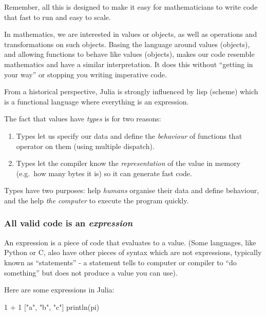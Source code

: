 \documentclass[
]{article}
\newenvironment{Shaded}{\begin{snugshade}}{\end{snugshade}}
\newcommand{\ConstantTok}[1]{\textcolor[rgb]{0.56,0.35,0.01}{#1}}
\newcommand{\FloatTok}[1]{\textcolor[rgb]{0.68,0.00,0.00}{#1}}
\newcommand{\FunctionTok}[1]{\textcolor[rgb]{0.28,0.35,0.67}{#1}}
\newcommand{\NormalTok}[1]{\textcolor[rgb]{0.00,0.23,0.31}{#1}}
\newcommand{\OperatorTok}[1]{\textcolor[rgb]{0.37,0.37,0.37}{#1}}
\newcommand{\StringTok}[1]{\textcolor[rgb]{0.13,0.47,0.30}{#1}}
\providecommand{\tightlist}{%
  \setlength{\itemsep}{0pt}\setlength{\parskip}{0pt}}
\begin{document}
Remember, all this is designed to make it easy for mathematicians to
write code that fast to run and easy to scale.

In mathematics, we are interested in values or objects, as well as
operations and transformations on such objects. Basing the language
around values (objects), and allowing functions to behave like values
(objects), makes our code resemble mathematics and have a similar
interpretation. It does this without ``getting in your way'' or stopping
you writing imperative code.

From a historical perspective, Julia is strongly influenced by lisp
(scheme) which is a functional language where everything is an
expression.

The fact that values have \emph{types} is for two reasons:

\begin{enumerate}
\def\labelenumi{\arabic{enumi}.}
\tightlist
\item
  Types let us specify our data and define the \emph{behaviour} of
  functions that operator on them (using multiple dispatch).
\item
  Types let the compiler know the \emph{representation} of the value in
  memory (e.g.~how many bytes it is) so it can generate fast code.
\end{enumerate}

Types have two purposes: help \emph{humans} organise their data and
define behaviour, and the help \emph{the computer} to execute the
program quickly.

\subsubsection{\texorpdfstring{All valid code is an
\emph{expression}}{All valid code is an expression}}\label{all-valid-code-is-an-expression}

An expression is a piece of code that evaluates to a value. (Some
languages, like Python or C, also have other pieces of syntax which are
not expressions, typically known as ``statements'' - a statement tells
to computer or compiler to ``do something'' but does not produce a value
you can use).

Here are some expressions in Julia:

\begin{Shaded}
\begin{Highlighting}[]
\FloatTok{1} \OperatorTok{+} \FloatTok{1}
\NormalTok{[}\StringTok{"a"}\NormalTok{, }\StringTok{"b"}\NormalTok{, }\StringTok{"c"}\NormalTok{]}
\FunctionTok{println}\NormalTok{(}\ConstantTok{pi}\NormalTok{)}
\end{Highlighting}
\end{Shaded}
\end{document}
